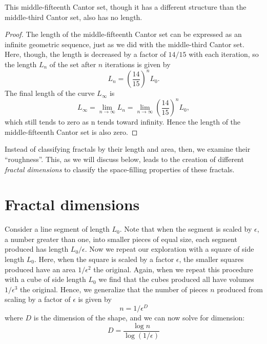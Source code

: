 \begin{myobs}This middle-fifteenth Cantor set, though it has a different structure than the middle-third Cantor set, also has no length.\end{myobs}

\begin{proof}The length of the middle-fifteenth Cantor set can be expressed as an infinite  geometric sequence, just as we did with the middle-third Cantor set. Here, though, the length is decreased by a factor of $14/15$ with each iteration, so the length $L_n$ of the set after $n$ iterations is given by
\begin{equation}
	L_n = \left(\frac{14}{15}\right)^n L_0.
\end{equation}
The final length of the curve $L_\infty$ is 
\begin{equation}
	L_\infty = \lim_{n \to \infty}L_n = \lim_{n \to \infty}\left(\frac{14}{15}\right)^n L_0,
\end{equation}
which still tends to zero as n tends toward infinity. Hence the length of the middle-fifteenth Cantor set is also zero.
\end{proof}

Instead of classifying fractals by their length and area, then, we examine their ``roughness''. This, as we will discuss below, leads to the creation of different \textit{fractal dimensions} to classify the space-filling properties of these fractals.


\section{Fractal dimensions}

Consider a line segment of length $ L_0 $. Note that when the segment is scaled by $\epsilon$, a number greater than one, into smaller pieces of equal size, each segment produced has length $L_0/\epsilon$. Now we repeat our exploration with a square of side length $ L_0 $. Here, when the square is scaled by a factor $\epsilon$, the smaller squares produced have an area $1/\epsilon^2$ the original. Again, when we repeat this procedure with a cube of side length $ L_0 $ we find that the cubes produced all have volumes $1/\epsilon^3$ the original. Hence, we generalize that the number of pieces $n$ produced from scaling by a factor of $\epsilon$ is given by 
\begin{equation}
n = 1/\epsilon^D
\end{equation}
where $D$ is the dimension of the shape, and we can now solve for dimension:
\begin{equation}\label{dimensionEqn}
 D = \frac{\log{n}}{\log{(1/\epsilon)}}
\end{equation}

